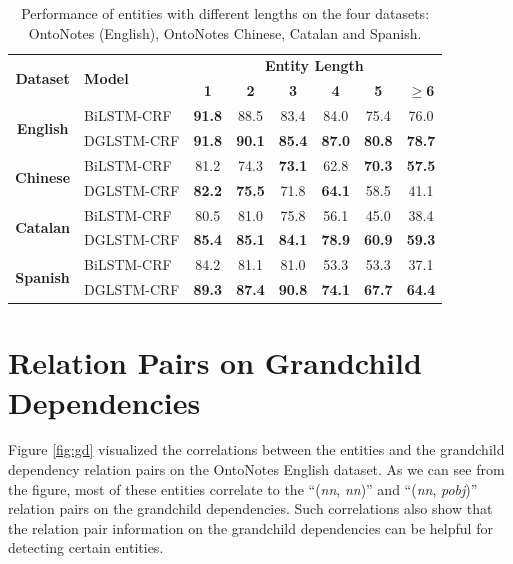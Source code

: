 \begin{table}[h!]
	\centering
	\begin{tabular}{clcccccc}
		\toprule
		\multirow{2}{*}{\textbf{Dataset}}& \multirow{2}{*}{\textbf{Model}} & \multicolumn{6}{c}{\textbf{Entity Length}} \\
		& & \textbf{1} & \textbf{2} & \textbf{3} & \textbf{4} & \textbf{5}  & $\mathbf{\geq}$\textbf{6}  \\
		\midrule
		\multirow{2}{*}{\textbf{English}} & BiLSTM-CRF & \textbf{91.8} & 88.5 & 83.4 & 84.0 & 75.4 & 76.0 \\
		& DGLSTM-CRF & \textbf{91.8} &  \textbf{90.1} &  \textbf{85.4}&  \textbf{87.0} &  \textbf{80.8} &  \textbf{78.7} \\ 
		\midrule
		\multirow{2}{*}{\textbf{Chinese}} & BiLSTM-CRF &81.2 & 74.3 & \textbf{73.1} & 62.8 & \textbf{70.3} & \textbf{57.5} \\
		& DGLSTM-CRF & \textbf{82.2}& \textbf{75.5} & 71.8 & \textbf{64.1} & 58.5 & 41.1\\
		\midrule
		\multirow{2}{*}{\textbf{Catalan}} & BiLSTM-CRF &80.5 & 81.0 & 75.8 & 56.1 & 45.0 & 38.4\\
		& DGLSTM-CRF & \textbf{85.4} & \textbf{85.1} & \textbf{84.1} & \textbf{78.9} & \textbf{60.9} & \textbf{59.3}\\
		\midrule
		\multirow{2}{*}{\textbf{Spanish}} & BiLSTM-CRF & 84.2 & 81.1 & 81.0 & 53.3 & 53.3 & 37.1\\
		& DGLSTM-CRF & \textbf{89.3} & \textbf{87.4} & \textbf{90.8} & \textbf{74.1} & \textbf{67.7} & \textbf{64.4}\\
		
		\bottomrule
	\end{tabular}
	\caption{Performance of entities with different lengths on the four datasets: OntoNotes (English), OntoNotes Chinese, Catalan and Spanish.}
	\label{tab:reslength}
\end{table}









\section{Relation Pairs on Grandchild Dependencies}
Figure \ref{fig:gd} visualized the correlations between the entities and the grandchild dependency relation pairs on the OntoNotes English dataset. 
As we can see from the figure, most of these entities correlate to the ``(\textit{nn}, \textit{nn})'' and ``(\textit{nn}, \textit{pobj})'' relation pairs on the grandchild dependencies. 
Such correlations also show that the relation pair information on the grandchild dependencies can be helpful for detecting certain entities. 

